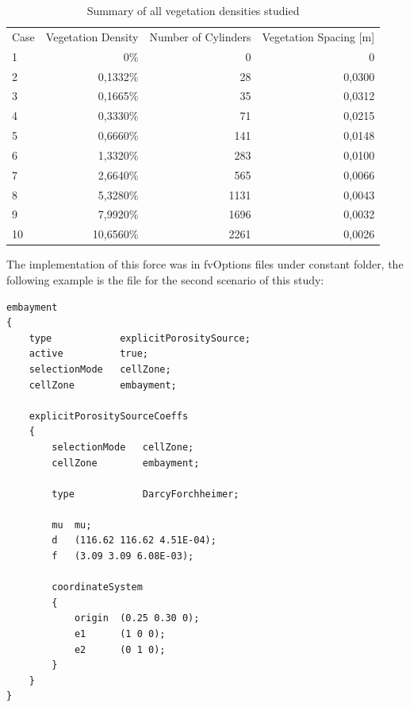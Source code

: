 \documentclass[../main.tex]{subfiles}
\begin{document}
\begin{table}[!hb]
\centering
\caption{Summary of all vegetation densities studied}
\label{tab:vegetationDensities}
\begin{tabular}{lrrr}
Case & \multicolumn{1}{l}{Vegetation Density} & \multicolumn{1}{l}{Number of Cylinders} & \multicolumn{1}{l}{Vegetation Spacing {[}m{]}} \\
1    & 0\%                                    & 0                                       & 0                                              \\ \hline
2    & 0,1332\%                               & 28                                      & 0,0300                                         \\
3    & 0,1665\%                               & 35                                      & 0,0312                                         \\
4    & 0,3330\%                               & 71                                      & 0,0215                                         \\
5    & 0,6660\%                               & 141                                     & 0,0148                                         \\
6    & 1,3320\%                               & 283                                     & 0,0100                                         \\
7    & 2,6640\%                               & 565                                     & 0,0066                                         \\
8    & 5,3280\%                               & 1131                                    & 0,0043                                         \\
9    & 7,9920\%                               & 1696                                    & 0,0032                                         \\
10   & 10,6560\%                              & 2261                                    & 0,0026                                        
\end{tabular}
\end{table}

The implementation of this force was in fvOptions files under constant folder, the following example is the file for the second scenario of this study:
\begin{lstlisting}
embayment
{
    type            explicitPorositySource;
    active			true;
	selectionMode   cellZone;
	cellZone        embayment;

    explicitPorositySourceCoeffs
    {
        selectionMode   cellZone;
        cellZone        embayment;

        type            DarcyForchheimer;
		
		mu	mu;
        d   (116.62 116.62 4.51E-04);
        f   (3.09 3.09 6.08E-03);

        coordinateSystem
        {
            origin  (0.25 0.30 0);
            e1      (1 0 0);
            e2      (0 1 0);
        }
    }
}
\end{lstlisting}
\end{document}
